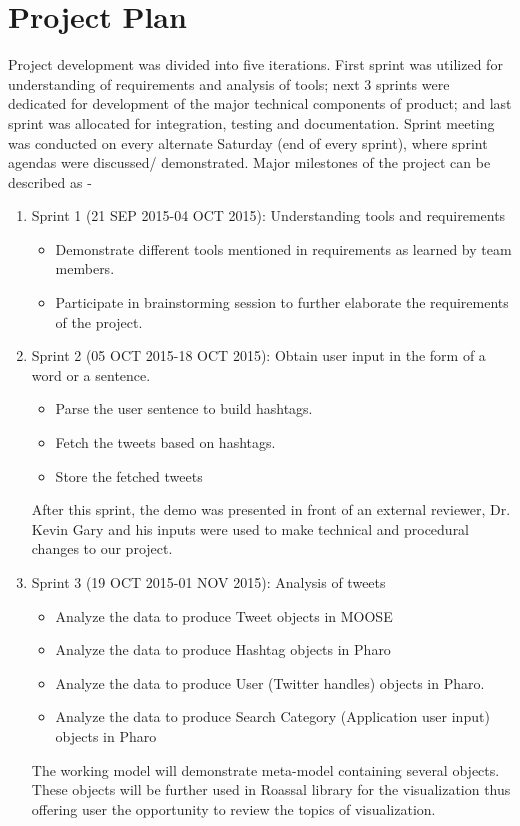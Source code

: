 \documentclass[11pt]{article}
\begin{document}
\section{Project Plan}
Project development was divided into five iterations. First sprint was utilized for understanding of requirements and analysis of tools; next 3 sprints were dedicated for development of the major technical components of product; and last sprint was allocated for integration, testing and documentation. Sprint meeting was conducted on every alternate Saturday (end of every sprint), where sprint agendas were discussed/ demonstrated. Major milestones of the project can be described as - 
\begin{enumerate}
\item Sprint 1 (21 SEP 2015-04 OCT 2015): Understanding tools and requirements
\begin{itemize}
\item Demonstrate different tools mentioned in requirements as learned by team members. 
\item Participate in brainstorming session to further elaborate the requirements of the project. 
\end{itemize}

\item Sprint 2 (05 OCT 2015-18 OCT 2015): Obtain user input in the form of a word or a sentence.
\begin{itemize}
\item Parse the user sentence to build hashtags.
\item Fetch the tweets based on hashtags.
\item Store the fetched tweets
\end{itemize}
After this sprint, the demo was presented in front of an external reviewer, Dr. Kevin Gary and his inputs were used to make technical and procedural changes to our project.

\item  Sprint 3 (19 OCT 2015-01 NOV 2015): Analysis of tweets
\begin{itemize}
\item Analyze the data to produce Tweet objects in MOOSE
\item Analyze the data to produce Hashtag objects in Pharo
\item Analyze the data to produce User (Twitter handles) objects in Pharo.
\item Analyze the data to produce Search Category (Application user input) objects in Pharo
\end{itemize}
The working model will demonstrate meta-model containing several objects. These objects will be further used in Roassal library for the visualization thus offering user the opportunity to review the topics of visualization.


\end{enumerate}
\end{document}
